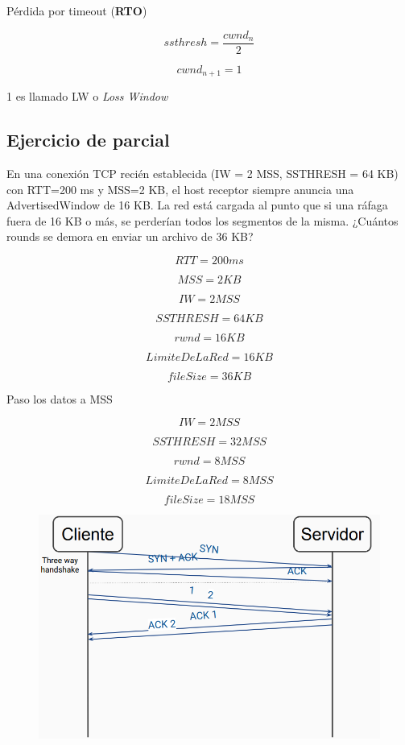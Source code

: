 \documentclass[titlepage,a4paper]{article}
\begin{document}
Pérdida por timeout (\textbf{RTO})

$$ ssthresh = \frac{cwnd_n}{2} $$

$$ cwnd_{n+1} = 1  $$

1 es llamado LW o \textit{Loss Window}

\subsection{Ejercicio de parcial}

En una conexión TCP recién establecida (IW = 2 MSS, SSTHRESH = 64 KB) con RTT=200 ms y MSS=2 KB, el host receptor siempre anuncia una AdvertisedWindow de 16 KB. La red está cargada al punto que si una ráfaga fuera de 16 KB o más, se perderían todos los segmentos de la misma.
¿Cuántos rounds se demora en enviar un archivo
de 36 KB?



$$ RTT = 200 ms $$

$$ MSS = 2 KB$$

$$ IW = 2 MSS $$

$$ SSTHRESH = 64 KB $$

$$ rwnd = 16 KB $$

$$ LimiteDeLaRed = 16 KB $$

$$ fileSize = 36 KB $$

Paso los datos a MSS

$$ IW = 2 MSS $$

$$ SSTHRESH = 32 MSS $$

$$ rwnd = 8 MSS $$

$$ LimiteDeLaRed = 8 MSS $$

$$ fileSize = 18 MSS $$



\begin{figure}[H]
\centering
\includegraphics[width=\textwidth]{resolucion1.png}
\end{figure}
\end{document}
